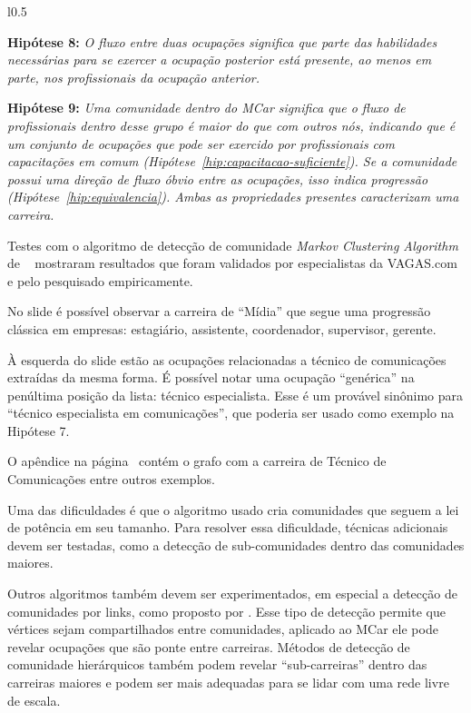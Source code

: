 \documentclass[10pt,a4paper,final]{article}
\begin{document}
\begin{minipage}[t]{\linewidth}
  \begin{wrapfigure}{l}{0.5\textwidth}
  \end{wrapfigure}
  
  \textbf{Hipótese 8:} \textit{ O fluxo entre duas ocupações significa que parte das habilidades necessárias para se exercer a ocupação posterior está presente, ao menos em parte, nos profissionais da ocupação anterior.}
  
  \textbf{Hipótese 9:} \textit{Uma comunidade dentro do MCar significa que o fluxo de profissionais dentro desse grupo é maior do que com outros nós, indicando que é um conjunto de ocupações que pode ser exercido por profissionais com capacitações em comum (Hipótese~\ref{hip:capacitacao-suficiente}). Se a comunidade possui uma direção de fluxo óbvio entre as ocupações, isso indica progressão (Hipótese~\ref{hip:equivalencia}). Ambas as propriedades presentes caracterizam uma carreira.}
  
  Testes com o algoritmo de detecção de comunidade \textit{Markov Clustering Algorithm} de ~ mostraram resultados que foram validados por especialistas da VAGAS.com e pelo pesquisado empiricamente.
  
  No slide é possível observar a carreira de \enquote{Mídia} que segue uma progressão clássica em empresas: estagiário, assistente, coordenador, supervisor, gerente.
  
  À esquerda do slide estão as ocupações relacionadas a técnico de comunicações extraídas da mesma forma. É possível notar uma ocupação \enquote{genérica} na penúltima posição da lista: técnico especialista. Esse é um provável sinônimo para \enquote{técnico especialista em comunicações}, que poderia ser usado como exemplo na Hipótese 7.
  
  O apêndice na página~\pageref{apx:exemplo-de-carreiras} contém o grafo com a carreira de Técnico de Comunicações entre outros exemplos.
  
  Uma das dificuldades é que o algoritmo usado cria comunidades que seguem a lei de potência em seu tamanho. Para resolver essa dificuldade, técnicas adicionais devem ser testadas, como a detecção de sub-comunidades dentro das comunidades maiores. 
  
  Outros algoritmos também devem ser experimentados, em especial a detecção de comunidades por links, como proposto por . Esse tipo de detecção permite que vértices sejam compartilhados entre comunidades, aplicado ao MCar ele pode revelar ocupações que são ponte entre carreiras. Métodos de detecção de comunidade hierárquicos também podem revelar \enquote{sub-carreiras} dentro das carreiras maiores e podem ser mais adequadas para se lidar com uma rede livre de escala.
\end{minipage}
\end{document}
